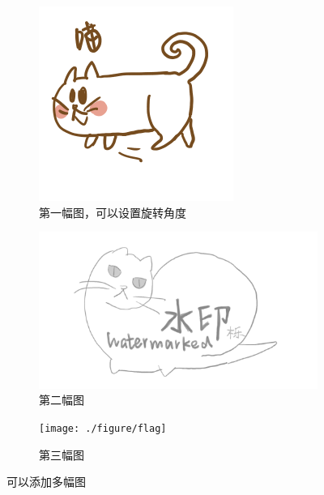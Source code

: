 \documentclass{ctexart}
\begin{document}
\begin{figure}[H]
	\centering
	\begin{subfigure}{0.4\textwidth}
		\includegraphics[width=\textwidth,angle=90]{./figure/Cat}
		\caption{第一幅图，可以设置旋转角度}
		\label{fig:first}
	\end{subfigure}
	\hfill
	\begin{subfigure}{0.4\textwidth}
		\includegraphics[width=1.2\textwidth]{./figure/watermarked}
		\caption{第二幅图}
		\label{fig:second}
	\end{subfigure}
	\hfill
	\begin{subfigure}{0.85\textwidth}
		\texttt{[image: ./figure/flag]}
		\caption{第三幅图}
		\label{fig:third}
	\end{subfigure}
	
	\caption{可以添加多幅图}
	\label{fig:figures}
	
\end{figure}
\end{document}
